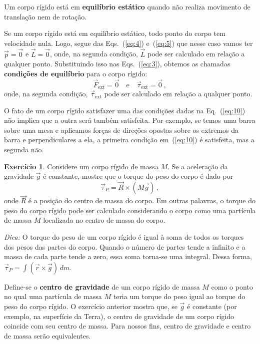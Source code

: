 \documentclass[12pt,a4paper]{article}
\theoremstyle{definition}
\newtheorem{ex}{Exercício}[section]
\begin{document}
Um corpo rígido está em \textbf{equi\-lí\-brio es\-tá\-ti\-co} quando não realiza
movimento de translação nem de rotação.

Se um corpo rígido está em equilíbrio estático, todo ponto do corpo
tem velocidade nula. Logo, segue das Eqs.~(\ref{eq:4}) e~(\ref{eq:5})
que nesse caso vamos ter $\vec p=\vec 0$ e $\vec L=\vec 0$,
onde, na segunda condição, $\vec L$ pode ser calculado em relação a
qualquer ponto. Substituindo isso nas Eqs.~(\ref{eq:3}), obtemos as
chamadas \textbf{condições de equilíbrio} para o corpo rígido:
\begin{equation}
  \label{eq:10}
  {\vec F}_{\mathrm{ext}}=\vec 0\quad\text{e}\quad \vec\tau_{\mathrm{ext}}=\vec 0\,,
\end{equation}
onde, na segunda condição, $\vec\tau_{\mathrm{ext}}$ pode ser
calculado em relação a qualquer ponto.

O fato de um corpo rígido satisfazer uma das condições dadas na
Eq.~(\ref{eq:10}) não implica que a outra será também satisfeita. Por
exemplo, se temos uma barra sobre uma mesa e aplicamos forças de
direções opostas sobre os extremos da barra e perpendiculares a ela, a
primeira condição em~(\ref{eq:10}) é satisfeita, mas a segunda não.

\begin{ex}
  \label{ex:1}
  Considere um corpo rígido de massa $M$. Se a aceleração da gravidade
  $\vec g$ é constante, mostre que o torque do peso do corpo é dado
  por
  $$\vec\tau_P=\vec R\times(M\vec g)\,,$$
  onde $\vec R$ é a posição do
  centro de massa do corpo. Em outras palavras, o torque do peso do
  corpo rígido pode ser calculado considerando o corpo como uma
  partícula de massa $M$ localizada no centro de massa do corpo.

  \noindent\textit{Dica:} O torque do peso de um corpo rígido é igual
  à soma de todos os torques dos pesos das partes do corpo. Quando o
  número de partes tende a infinito e a massa de cada parte tende a
  zero, essa soma torna-se uma integral. Dessa forma,
  $\vec\tau_P=\int (\vec r\times\vec g)\,dm$.
\end{ex}

Define-se o \textbf{centro de gravidade} de um corpo rígido de massa $M$
como o ponto no qual uma partícula de massa $M$ teria um torque do
peso igual ao torque do peso do corpo rígido. O exercício anterior
mostra que, se $\vec g$ é constante (por exemplo, na superfície da
Terra), o centro de gravidade de um corpo rígido coincide com seu
centro de massa. Para nossos fins, centro de gravidade e centro de
massa serão equivalentes.
\end{document}

